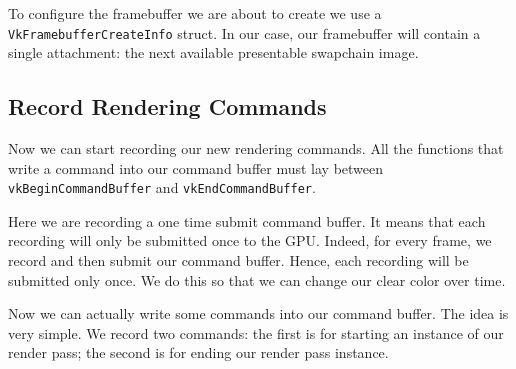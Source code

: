To configure the framebuffer we are about to create we use a \texttt{VkFramebufferCreateInfo}
struct.
In our case, our framebuffer will contain a single attachment: the next
available presentable swapchain image.

\begin{minipage}{\linewidth}{\noindent}
    
\end{minipage}

\subsection{Record Rendering Commands}

Now we can start recording our new rendering commands.
All the functions that write a command into our command buffer must lay
between \texttt{vkBeginCommandBuffer} and \texttt{vkEndCommandBuffer}.

\begin{minipage}{\linewidth}{\noindent}
    
\end{minipage}

Here we are recording a one time submit command buffer.
It means that each recording will only be submitted once to the GPU.
Indeed, for every frame, we record and then submit our command buffer.
Hence, each recording will be submitted only once.
We do this so that we can change our clear color over time.

\begin{minipage}{\linewidth}{\noindent}
    
\end{minipage}

Now we can actually write some commands into our command buffer.
The idea is very simple.
We record two commands: the first is for starting an instance of our render pass;
the second is for ending our render pass instance.

\begin{minipage}{\linewidth}{\noindent}
    
\end{minipage}

